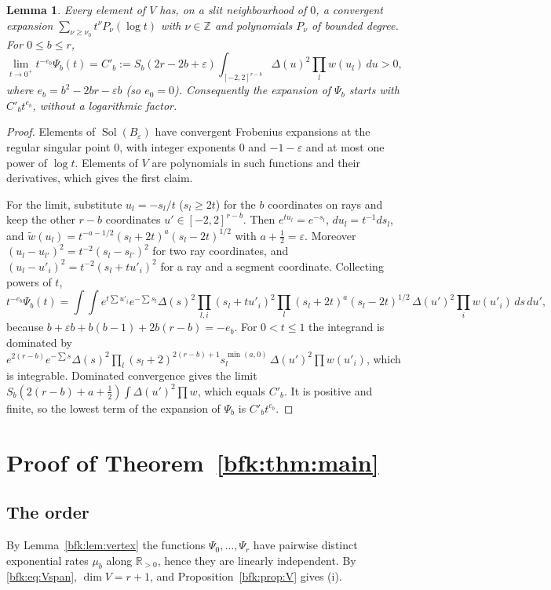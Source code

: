 \documentclass[11pt,a4paper]{article}
\newtheorem{lemma}[theorem]{Lemma}
\theoremstyle{definition}
\theoremstyle{remark}
\numberwithin{equation}{section}
\newcommand{\Z}{\mathbb{Z}}
\newcommand{\R}{\mathbb{R}}
\DeclareMathOperator{\Sol}{Sol}
\begin{document}
\begin{lemma}\label{bfk:lem:origin}
Every element of $V$ has, on a slit neighbourhood of $0$, a convergent expansion $\sum_{\nu\ge\nu_0}t^\nu P_\nu(\log t)$ with $\nu\in\Z$ and polynomials $P_\nu$ of bounded degree. For $0\le b\le r$,
\[
\lim_{t\to0^+}t^{-e_b}\Psi_b(t)=C'_b:=S_b(2r-2b+\varepsilon)\int_{[-2,2]^{r-b}}\Delta(u)^2\prod_lw(u_l)\,du>0,
\]
where $e_b=b^2-2br-\varepsilon b$ (so $e_0=0$). Consequently the expansion of $\Psi_b$ starts with $C'_bt^{e_b}$, without a logarithmic factor.
\end{lemma}

\begin{proof}
Elements of $\Sol(B_\varepsilon)$ have convergent Frobenius expansions at the regular singular point $0$, with integer exponents $0$ and $-1-\varepsilon$ and at most one power of $\log t$. Elements of $V$ are polynomials in such functions and their derivatives, which gives the first claim.

For the limit, substitute $u_l=-s_l/t$ ($s_l\ge2t$) for the $b$ coordinates on rays and keep the other $r-b$ coordinates $u'\in[-2,2]^{r-b}$. Then $e^{tu_l}=e^{-s_l}$, $du_l=t^{-1}ds_l$, and $\tilde w(u_l)=t^{-a-1/2}(s_l+2t)^{a}(s_l-2t)^{1/2}$ with $a+\frac12=\varepsilon$. Moreover $(u_l-u_{l'})^2=t^{-2}(s_l-s_{l'})^2$ for two ray coordinates, and $(u_l-u'_i)^2=t^{-2}(s_l+tu'_i)^2$ for a ray and a segment coordinate. Collecting powers of $t$,
\[
t^{-e_b}\Psi_b(t)=\int\!\!\int e^{t\sum u'_i}e^{-\sum s_l}\Delta(s)^2\prod_{l,i}(s_l+tu'_i)^2\prod_l(s_l+2t)^a(s_l-2t)^{1/2}\,\Delta(u')^2\prod_iw(u'_i)\,ds\,du',
\]
because $b+\varepsilon b+b(b-1)+2b(r-b)=-e_b$. For $0<t\le1$ the integrand is dominated by $e^{2(r-b)}e^{-\sum s}\Delta(s)^2\prod_l(s_l+2)^{2(r-b)+1}s_l^{\min(a,0)}\,\Delta(u')^2\prod w(u'_i)$, which is integrable. Dominated convergence gives the limit $S_b(2(r-b)+a+\frac12)\int\Delta(u')^2\prod w$, which equals $C'_b$. It is positive and finite, so the lowest term of the expansion of $\Psi_b$ is $C'_bt^{e_b}$.
\end{proof}

\section{Proof of \texorpdfstring{Theorem~\ref{bfk:thm:main}}{the main theorem}}\label{bfk:sec:proof}

\subsection{The order}
By Lemma~\ref{bfk:lem:vertex} the functions $\Psi_0,\dots,\Psi_r$ have pairwise distinct exponential rates $\mu_b$ along $\R_{>0}$, hence they are linearly independent. By \eqref{bfk:eq:Vspan}, $\dim V=r+1$, and Proposition~\ref{bfk:prop:V} gives (i).
\end{document}

